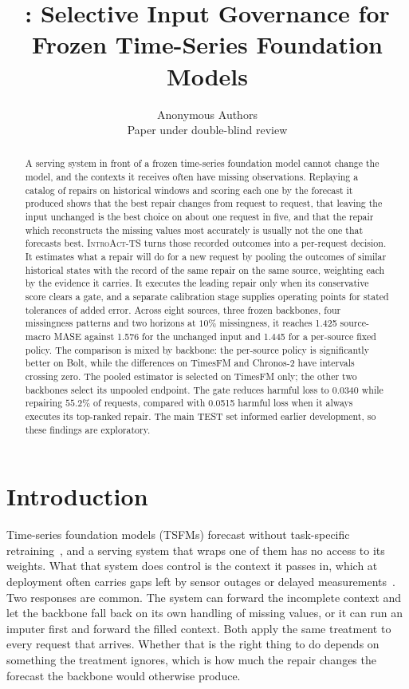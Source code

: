 \documentclass{article}
\title{\introact{}: Selective Input Governance for \\
Frozen Time-Series Foundation Models}
\author{Anonymous Authors\\Paper under double-blind review}
\newcommand{\introact}{\textsc{IntroAct-TS}}
\newcommand{\tsfm}{TSFM}
\begin{document}
\maketitle

\begin{abstract}
A serving system in front of a frozen time-series foundation model cannot change the model,
and the contexts it receives often have missing observations. Replaying a catalog of repairs
on historical windows and scoring each one by the forecast it produced shows that the best
repair changes from request to request, that leaving the input unchanged is the best choice on
about one request in five, and that the repair which reconstructs the missing values most
accurately is usually not the one that forecasts best. \introact{} turns those recorded
outcomes into a per-request decision. It estimates what a repair will do for a new request by
pooling the outcomes of similar historical states with the record of the same repair on the
same source, weighting each by the evidence it carries. It executes the leading repair only
when its conservative score clears a gate, and a separate calibration stage supplies
operating points for stated tolerances of added error. Across eight sources, three frozen
backbones, four missingness patterns and two horizons at $10\%$ missingness, it reaches 1.425
source-macro MASE against 1.576 for the unchanged input and 1.445 for a per-source fixed
policy. The comparison is mixed by backbone: the per-source policy is significantly better
on Bolt, while the differences on TimesFM and Chronos-2 have intervals crossing zero. The
pooled estimator is selected on TimesFM only; the other two backbones select its unpooled
endpoint. The gate reduces harmful loss to 0.0340 while repairing $55.2\%$ of requests,
compared with 0.0515 harmful loss when it always executes its top-ranked repair. The main
TEST set informed earlier development, so these findings are exploratory.

\end{abstract}

\section{Introduction}
\label{sec:intro}

Time-series foundation models (\tsfm{}s) forecast without task-specific
retraining~\citep{ansari2024chronos,chronosbolt2025,das2024timesfm,woo2024moirai,chronos2_2025},
and a serving system that wraps one of them has no access to its weights. What that system
does control is the context it passes in, which at deployment often carries gaps left by
sensor outages or delayed measurements~\citep{chen2024bitgraph,peng2025s4m}. Two responses are
common. The system can forward the incomplete context and let the backbone fall back on its
own handling of missing values, or it can run an imputer first and forward the filled context.
Both apply the same treatment to every request that arrives. Whether that is the right thing
to do depends on something the treatment ignores, which is how much the repair changes the
forecast the backbone would otherwise produce.
\end{document}
